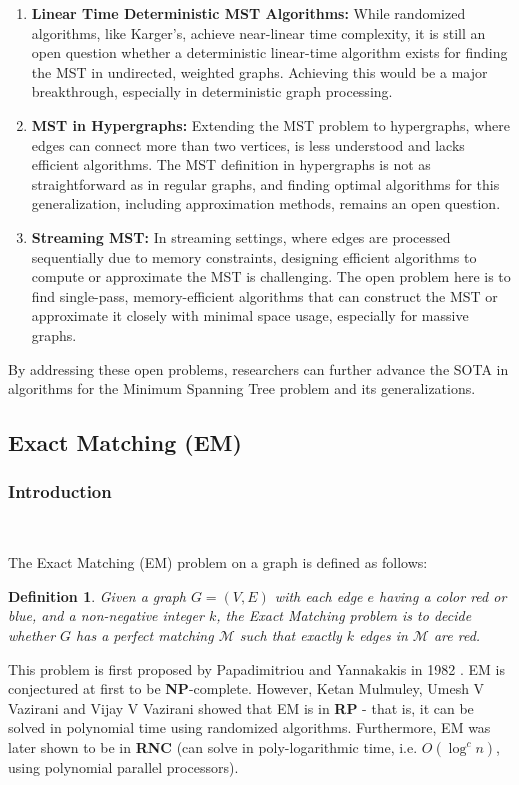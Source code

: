 \documentclass[11pt]{article}
\theoremstyle{plain}
\newtheorem{definition}{Definition}[section]
\begin{document}
\begin{enumerate}
    \item \textbf{Linear Time Deterministic MST Algorithms:} While randomized algorithms, like Karger's, achieve near-linear time complexity, it is still an open question whether a deterministic linear-time algorithm exists for finding the MST in undirected, weighted graphs. Achieving this would be a major breakthrough, especially in deterministic graph processing.
    \item \textbf{MST in Hypergraphs:} Extending the MST problem to hypergraphs, where edges can connect more than two vertices, is less understood and lacks efficient algorithms. The MST definition in hypergraphs is not as straightforward as in regular graphs, and finding optimal algorithms for this generalization, including approximation methods, remains an open question.
    \item \textbf{Streaming MST:} In streaming settings, where edges are processed sequentially due to memory constraints, designing efficient algorithms to compute or approximate the MST is challenging. The open problem here is to find single-pass, memory-efficient algorithms that can construct the MST or approximate it closely with minimal space usage, especially for massive graphs.
\end{enumerate}

By addressing these open problems, researchers can further advance the SOTA in algorithms for the Minimum Spanning Tree problem and its generalizations.

\subsection{Exact Matching (EM)}

\subsubsection{Introduction}\

The Exact Matching (EM) problem on a graph is defined as follows:
\begin{definition}
    Given a graph $G=(V,E)$ with each edge $e$ having a color red or blue, and a non-negative integer $k$, the Exact Matching problem is to decide whether $G$ has a perfect matching $\mathcal{M}$ such that exactly $k$ edges in $\mathcal{M}$ are red.
\end{definition}
This problem is first proposed by Papadimitriou and Yannakakis in 1982 \cite{papadimitriou1982complexity}. EM is conjectured at first to be \textbf{NP}-complete. However, Ketan Mulmuley, Umesh V Vazirani and Vijay V Vazirani\cite{mulmuley1987matching} showed that EM is in \textbf{RP} - that is, it can be solved in polynomial time using randomized algorithms. Furthermore, EM was later shown to be in \textbf{RNC} (can solve in poly-logarithmic time, i.e. $O(\log^cn)$, using polynomial parallel processors).
\end{document}
